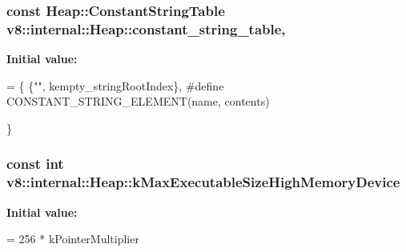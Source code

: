 \subsubsection[{\texorpdfstring{constant\+\_\+string\+\_\+table}{constant_string_table}}]{\setlength{\rightskip}{0pt plus 5cm}const {\bf Heap\+::\+Constant\+String\+Table} v8\+::internal\+::\+Heap\+::constant\+\_\+string\+\_\+table\hspace{0.3cm}{\ttfamily [static]}, {\ttfamily [private]}}\hypertarget{classv8_1_1internal_1_1_heap_a1da0d944b60ec6a438e99bb787fe91e3}{}\label{classv8_1_1internal_1_1_heap_a1da0d944b60ec6a438e99bb787fe91e3}
{\bfseries Initial value\+:}
\begin{DoxyCode}
= \{
    \{\textcolor{stringliteral}{""}, kempty\_stringRootIndex\},
\textcolor{preprocessor}{#define CONSTANT\_STRING\_ELEMENT(name, contents) }




\}
\end{DoxyCode}
\subsubsection[{\texorpdfstring{k\+Max\+Executable\+Size\+High\+Memory\+Device}{kMaxExecutableSizeHighMemoryDevice}}]{\setlength{\rightskip}{0pt plus 5cm}const int v8\+::internal\+::\+Heap\+::k\+Max\+Executable\+Size\+High\+Memory\+Device\hspace{0.3cm}{\ttfamily [static]}}\hypertarget{classv8_1_1internal_1_1_heap_a577d018a68b0e661307df327eab7f00d}{}\label{classv8_1_1internal_1_1_heap_a577d018a68b0e661307df327eab7f00d}
{\bfseries Initial value\+:}
\begin{DoxyCode}
=
      256 * kPointerMultiplier
\end{DoxyCode}

